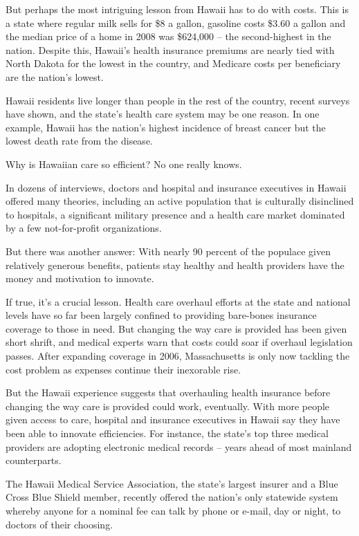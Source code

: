 ﻿\documentclass[12pt]{article}
\begin{document}
But perhaps the most intriguing lesson from Hawaii has to do with costs. This is a state where
regular milk sells for \$8 a gallon, gasoline costs \$3.60 a gallon and the median price of a home
in 2008 was \$624,000 -- the second-highest in the nation. Despite this, Hawaii's health insurance
premiums are nearly tied with North Dakota for the lowest in the country, and Medicare costs per
beneficiary are the nation's lowest.

Hawaii residents live longer than people in the rest of the country, recent surveys have shown, and
the state's health care system may be one reason. In one example, Hawaii has the nation's highest
incidence of breast cancer but the lowest death rate from the disease.

Why is Hawaiian care so efficient? No one really knows.

In dozens of interviews, doctors and hospital and insurance executives in Hawaii offered many
theories, including an active population that is culturally disinclined to hospitals, a significant
military presence and a health care market dominated by a few not-for-profit organizations.

But there was another answer: With nearly 90 percent of the populace given relatively generous
benefits, patients stay healthy and health providers have the money and motivation to innovate.

If true, it's a crucial lesson. Health care overhaul efforts at the state and national levels have
so far been largely confined to providing bare-bones insurance coverage to those in need. But
changing the way care is provided has been given short shrift, and medical experts warn that costs
could soar if overhaul legislation passes. After expanding coverage in 2006, Massachusetts is only
now tackling the cost problem as expenses continue their inexorable\cite{inexorable} rise.

But the Hawaii experience suggests that overhauling health insurance before changing the way care is
provided could work, eventually. With more people given access to care, hospital and insurance
executives in Hawaii say they have been able to innovate efficiencies. For instance, the state's top
three medical providers are adopting electronic medical records -- years ahead of most mainland
counterparts.

The Hawaii Medical Service Association, the state's largest insurer and a Blue Cross Blue Shield
member, recently offered the nation's only statewide system whereby anyone for a nominal fee can
talk by phone or e-mail, day or night, to doctors of their choosing.
\end{document}
